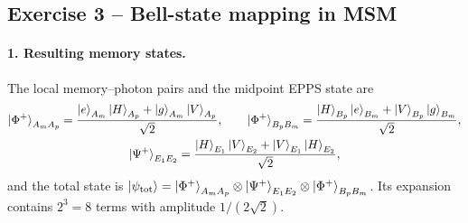 
\subsection{Exercise 3 -- Bell-state mapping in MSM}
\label{sec:q3}

\paragraph{1. Resulting memory states.}
The local memory--photon pairs and the midpoint EPPS state are
\begin{gather}
  \ket{\Phi^+}_{A_mA_p} = \frac{\ket{e}_{A_m}\ket{H}_{A_p} + \ket{g}_{A_m}\ket{V}_{A_p}}{\sqrt2},\qquad
  \ket{\Phi^+}_{B_pB_m} = \frac{\ket{H}_{B_p}\ket{e}_{B_m} + \ket{V}_{B_p}\ket{g}_{B_m}}{\sqrt2},\\
  \ket{\Psi^+}_{E_1E_2} = \frac{\ket{H}_{E_1}\ket{V}_{E_2} + \ket{V}_{E_1}\ket{H}_{E_2}}{\sqrt2},
\end{gather}
and the total state is
$\ket{\psi_\mathrm{tot}} = \ket{\Phi^+}_{A_mA_p}\otimes\ket{\Psi^+}_{E_1E_2}\otimes\ket{\Phi^+}_{B_pB_m}$.
Its expansion contains $2^3 = 8$ terms with amplitude $1/(2\sqrt2)$.

